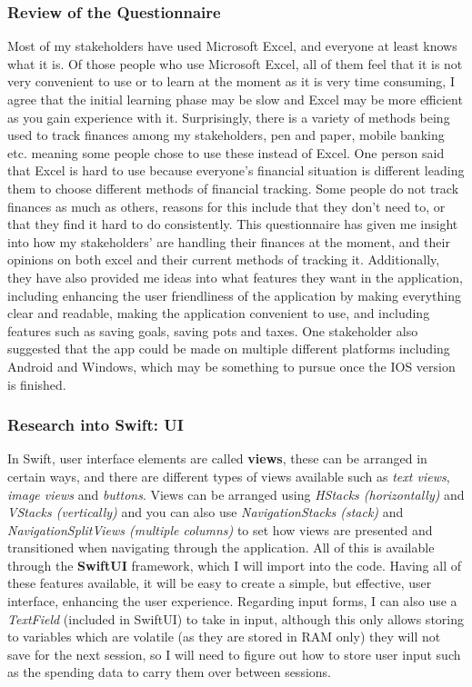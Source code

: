 \documentclass{article}
\begin{document}
\subsubsection{Review of the Questionnaire}
Most of my stakeholders have used Microsoft Excel, and everyone at least knows what it is. Of those people who use Microsoft Excel, all of them feel that it is not very convenient to use or to learn at the moment as it is very time consuming, I agree that the initial learning phase may be slow and Excel may be more efficient as you gain experience with it. Surprisingly, there is a variety of methods being used to track finances among my stakeholders, pen and paper, mobile banking etc. meaning some people chose to use these instead of Excel. One person said that Excel is hard to use because everyone's financial situation is different leading them to choose different methods of financial tracking. Some people do not track finances as much as others, reasons for this include that they don't need to, or that they find it hard to do consistently. This questionnaire has given me insight into how my stakeholders' are handling their finances at the moment, and their opinions on both excel and their current methods of tracking it. Additionally, they have also provided me ideas into what features they want in the application, including enhancing the user friendliness of the application by making everything clear and readable, making the application convenient to use, and including features such as saving goals, saving pots and taxes. One stakeholder also suggested that the app could be made on multiple different platforms including Android and Windows, which may be something to pursue once the IOS version is finished.

\subsubsection{Research into Swift: UI}
In Swift, user interface elements are called \textbf{views}, these can be arranged in certain ways, and there are different types of views available such as \textit{text views}, \textit{image views} and \textit{buttons}. Views can be arranged using \textit{HStacks (horizontally)} and \textit{VStacks (vertically)} and you can also use \textit{NavigationStacks (stack)} and \textit{NavigationSplitViews (multiple columns)} to set how views are presented and transitioned when navigating through the application. All of this is available through the \textbf{SwiftUI} framework, which I will import into the code. Having all of these features available, it will be easy to create a simple, but effective, user interface, enhancing the user experience. Regarding input forms, I can also use a \textit{TextField} (included in SwiftUI) to take in input, although this only allows storing to variables which are volatile (as they are stored in RAM only) they will not save for the next session, so I will need to figure out how to store user input such as the spending data to carry them over between sessions. 
\end{document}
